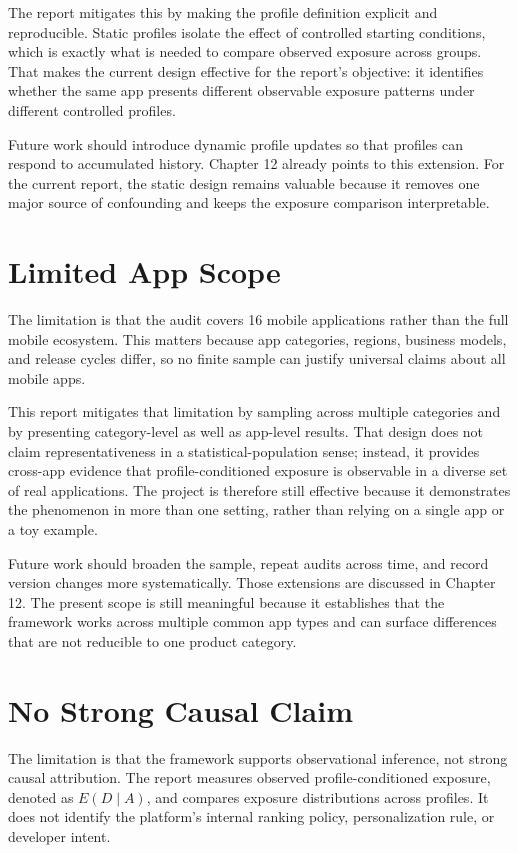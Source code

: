 The report mitigates this by making the profile definition explicit and reproducible. Static profiles isolate the effect of controlled starting conditions, which is exactly what is needed to compare observed exposure across groups. That makes the current design effective for the report's objective: it identifies whether the same app presents different observable exposure patterns under different controlled profiles.

Future work should introduce dynamic profile updates so that profiles can respond to accumulated history. Chapter 12 already points to this extension. For the current report, the static design remains valuable because it removes one major source of confounding and keeps the exposure comparison interpretable.

\section{Limited App Scope}

The limitation is that the audit covers 16 mobile applications rather than the full mobile ecosystem. This matters because app categories, regions, business models, and release cycles differ, so no finite sample can justify universal claims about all mobile apps.

This report mitigates that limitation by sampling across multiple categories and by presenting category-level as well as app-level results. That design does not claim representativeness in a statistical-population sense; instead, it provides cross-app evidence that profile-conditioned exposure is observable in a diverse set of real applications. The project is therefore still effective because it demonstrates the phenomenon in more than one setting, rather than relying on a single app or a toy example.

Future work should broaden the sample, repeat audits across time, and record version changes more systematically. Those extensions are discussed in Chapter 12. The present scope is still meaningful because it establishes that the framework works across multiple common app types and can surface differences that are not reducible to one product category.

\section{No Strong Causal Claim}

The limitation is that the framework supports observational inference, not strong causal attribution. The report measures observed profile-conditioned exposure, denoted as $E(D \mid A)$, and compares exposure distributions across profiles. It does not identify the platform's internal ranking policy, personalization rule, or developer intent.

